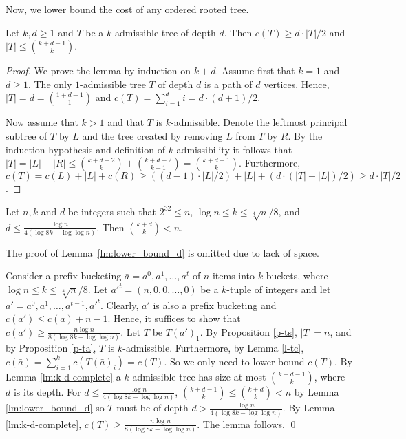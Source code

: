 \documentclass[runningheads,a4paper]{llncs}
\newenvironment{proofof}[1]{\noindent{\it Proof of #1. }} {{\qed}}
\begin{document}
Now, we lower bound the cost of any ordered rooted tree.

\begin{lemma}

\label{lm:k-d-complete}
Let $k,d \geq 1$ and $T$ be a $k$-admissible tree of depth $d$.
Then $c(T) \geq d \cdot |T| / 2$ and $|T| \leq \binom{k + d - 1}{k}$.
\end{lemma}
\begin{proof}
We prove the lemma by induction on $k + d$. Assume first that $k = 1$ and $d \geq 1$.
The only $1$-admissible tree $T$ of depth $d$ is a path of $d$ vertices. Hence,
$|T| = d = \binom{1 + d - 1}{1}$ and $c(T)=\sum_{i = 1}^d i  = d \cdot (d + 1) / 2$.

Now assume that $k > 1$ and that $T$ is $k$-admissible.
Denote the leftmost principal subtree of $T$ by $L$ and the tree created by removing $L$ from $T$ by $R$.
By the induction hypothesis and definition of $k$-admissibility it follows that $|T| = |L| + |R| \leq \binom{k + d - 2}{k} + \binom{k + d - 2}{k - 1} = \binom{k + d - 1}{k}$.
Furthermore, $c(T) = c(L) + |L| +  c(R) \geq ((d-1) \cdot |L|  / 2) + |L| + (d \cdot (|T| - |L|) / 2) \geq d \cdot |T| / 2$.
\end{proof}

\begin{lemma}
\label{lm:lower_bound_d} 
Let $n,k$ and $d$ be integers such that $2^{32} \leq n$, $\log n \le k \le \sqrt[4]{n}/8$, and 
$d \le \frac{\log n}{4 (\log 8k - \log \log n)}$. Then ${k+d \choose k} < n$. 
\end{lemma}

The proof of Lemma~\ref{lm:lower_bound_d} is omitted due to lack of space.

\begin{proofof}{Lemma \ref{l-lbb}}
Consider a prefix bucketing $\bar{a} = a^0,a^1,\dots,a^t$ of $n$ items into $k$ buckets, 
where $\log n \le k \le \sqrt[4]{n}/8$. Let $a'^t = (n,0,0,\dots,0)$ be a $k$-tuple of integers and
let  $\bar{a}' = a^0,a^1,\dots,a^{t-1},a'^t$. Clearly, $\bar{a}'$ is also a prefix bucketing and $c(\bar{a}') \le c(\bar{a}) + n-1$. Hence, it suffices to 
show that $c(\bar{a}') \ge  \frac{n \log n}{8 (\log 8k - \log \log n)}$. Let $T$ be $T(\bar{a}')_1$. By Proposition \ref{p-ts}, $|T|=n$, and by Proposition \ref{p-ta}, $T$ is $k$-admissible.
Furthermore, by Lemma \ref{l-tc},  $c(\bar{a}) = \sum_{i=1}^k c(T(\bar{a})_i) = c(T)$. So we only need to lower bound $c(T)$. By Lemma \ref{lm:k-d-complete}
a $k$-admissible tree has size at most $\binom{k + d - 1}{k}$, where $d$ is its depth. For $d \le  \frac{\log n}{4 (\log 8k - \log \log n)}$,  $\binom{k + d - 1}{k} \le \binom{k + d}{k} < n$
by Lemma \ref{lm:lower_bound_d} so $T$ must be of depth $d > \frac{\log n}{4 (\log 8k - \log \log n)}$.
By Lemma \ref{lm:k-d-complete}, $c(T) \ge \frac{n \log n}{8 (\log 8k - \log \log n)}$. The lemma follows.
\end{proofof}
\end{document}
